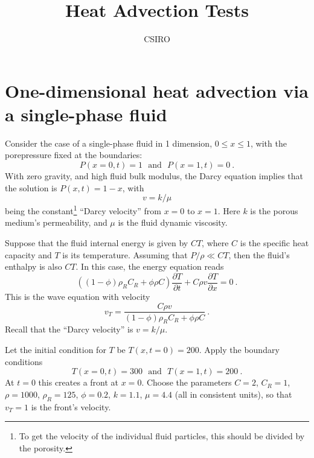 \documentclass[]{scrreprt}
\begin{document}
\title{Heat Advection Tests}
\author{CSIRO}
\maketitle

\tableofcontents

\chapter{One-dimensional heat advection via a single-phase fluid}

Consider the case of a single-phase fluid in 1 dimension, $0\leq x
\leq 1$, with the porepressure fixed at the boundaries:
\begin{equation}
P(x=0, t) = 1 \ \ \ \mbox{and}\ \ \ P(x=1, t) = 0 \ .
\end{equation}
With zero gravity, and high fluid bulk modulus, the Darcy equation
implies that the solution is $P(x, t) = 1 - x$, with
\begin{equation}
v = k/\mu
\end{equation}
being the constant\footnote{To get the velocity of the individual
  fluid particles, this should be divided by the porosity.} ``Darcy
velocity'' from $x=0$ to $x=1$.  Here $k$ is the porous medium's
permeability, and $\mu$ is the fluid dynamic viscosity.

Suppose that the fluid internal energy is given by $CT$, where $C$ is
the specific heat capacity and $T$ is its temperature.  Assuming that
$P/\rho \ll CT$, then the fluid's enthalpy is also $CT$.  In this
case, the energy equation reads
\begin{equation}
\left((1 - \phi)\rho_{R}C_{R} + \phi\rho C \right) \frac{\partial
  T}{\partial t} + C \rho v \frac{\partial T}{\partial x} = 0 \ .
\end{equation}
This is the wave equation with velocity
\begin{equation}
v_{T} = \frac{C\rho v}{(1 - \phi)\rho_{R}C_{R} + \phi\rho C} \ .
\end{equation}
Recall that the ``Darcy velocity'' is $v=k/\mu$.

Let the initial condition for $T$ be $T(x, t=0) = 200$.  Apply the
boundary conditions
\begin{equation}
T(x=0, t) = 300 \ \ \ \mbox{and} \ \ \ T(x=1, t) = 200 \ .
\end{equation}
At $t=0$ this creates a front at $x=0$.  Choose the parameters $C=2$,
$C_{R}=1$, $\rho=1000$, $\rho_{R}=125$, $\phi=0.2$, $k=1.1$, $\mu=4.4$
(all in consistent units), so that $v_{T}=1$ is the front's velocity.
\end{document}
